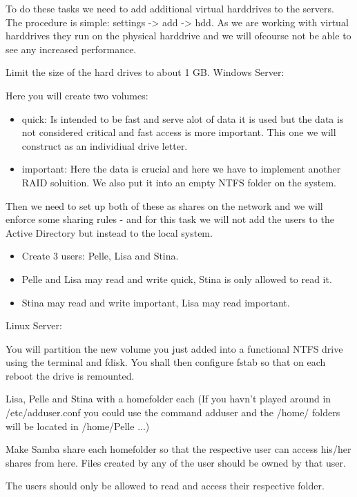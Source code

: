\documentclass[paper=a4, fontsize=11pt]{report} %
\begin{document}
To do these tasks we need to add additional virtual harddrives to the servers. The procedure is simple: settings -> add -> hdd. As we are working with virtual harddrives they run on the physical harddrive and we will ofcourse not be able to see any increased performance. 

Limit the size of the hard drives to about 1 GB.
Windows Server:

Here you will create two volumes:

\begin{itemize}
	\item quick: Is intended to be fast and serve alot of data it is used but the data is not considered critical and fast access is more important. This one we will construct as an individiual drive letter.
	\item important: Here the data is crucial and here we have to implement another RAID soluition.  We also put it into an empty NTFS folder on the system.
\end{itemize}

Then we need to set up both of these as shares on the network and we will enforce some sharing rules - and for this task we will not add the users to the Active Directory but instead to the local system.

\begin{itemize}
	\item Create 3 users: Pelle, Lisa and Stina.
	\item Pelle and Lisa may read and write quick, Stina is only allowed to read it.
	\item Stina may read and write important, Lisa may read important.
\end{itemize}

Linux Server:

You will partition the new volume you just added into a functional NTFS drive using the terminal and fdisk. You shall then configure fstab so that on each reboot the drive is remounted.

Lisa, Pelle and Stina with a homefolder each (If you havn’t played around in /etc/adduser.conf you could use the command adduser and the /home/ folders will be located in /home/Pelle ...)

Make Samba share each homefolder so that the respective user can access his/her shares from here. Files created by any of the user should be owned by that user.

The users should only be allowed to read and access their respective folder.
\end{document}
